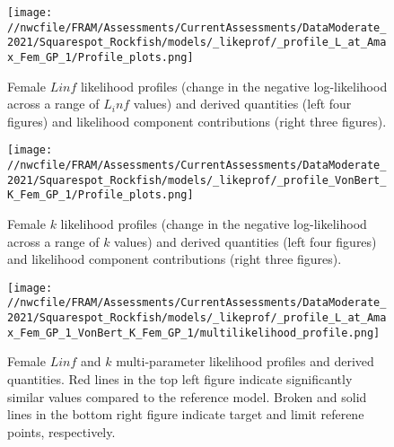 \documentclass[11pt,
  english,
  a4paper,
]{article}
\begin{document}
\begin{figure}
\centering
\texttt{[image: //nwcfile/FRAM/Assessments/CurrentAssessments/DataModerate\_2021/Squarespot\_Rockfish/models/\_likeprof/\_profile\_L\_at\_Amax\_Fem\_GP\_1/Profile\_plots.png]}
\caption{Female {\(Linf\)\leavevmode\tagmcend\tagstructend} likelihood profiles (change in the negative log-likelihood across a range of {\(L_inf\)\leavevmode\tagmcend\tagstructend} values) and derived quantities (left four figures) and likelihood component contributions (right three figures).\label{fig:Linf_F-profile-combo}}
\end{figure}

\tagmcend\tagstructend


\begin{figure}
\centering
\texttt{[image: //nwcfile/FRAM/Assessments/CurrentAssessments/DataModerate\_2021/Squarespot\_Rockfish/models/\_likeprof/\_profile\_VonBert\_K\_Fem\_GP\_1/Profile\_plots.png]}
\caption{Female {\(k\)\leavevmode\tagmcend\tagstructend} likelihood profiles (change in the negative log-likelihood across a range of {\(k\)\leavevmode\tagmcend\tagstructend} values) and derived quantities (left four figures) and likelihood component contributions (right three figures).\label{fig:k_f-profile-combo}}
\end{figure}

\tagmcend\tagstructend


\begin{figure}
\centering
\texttt{[image: //nwcfile/FRAM/Assessments/CurrentAssessments/DataModerate\_2021/Squarespot\_Rockfish/models/\_likeprof/\_profile\_L\_at\_Amax\_Fem\_GP\_1\_VonBert\_K\_Fem\_GP\_1/multilikelihood\_profile.png]}
\caption{Female {\(Linf\)\leavevmode\tagmcend\tagstructend} and {\(k\)\leavevmode\tagmcend\tagstructend} multi-parameter likelihood profiles and derived quantities. Red lines in the top left figure indicate significantly similar values compared to the reference model. Broken and solid lines in the bottom right figure indicate target and limit referene points, respectively.\label{fig:Linf_k_f-profile}}
\end{figure}
\end{document}
